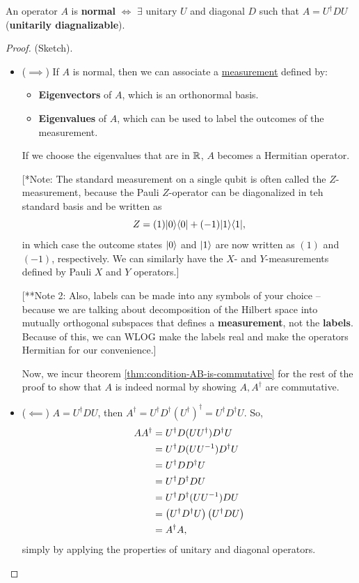 \documentclass[12pt]{article}
\begin{document}
\begin{theorem}
An operator $A$ is \textbf{normal} $\iff$ $\exists$ unitary $U$ and diagonal $D$ such that $A = U^\dag D U$ (\textbf{unitarily diagnalizable}).
\end{theorem}
\begin{proof}(Sketch).
\begin{itemize}
    \item ($\implies$) If $A$ is normal, then we can associate a \underline{measurement} defined by:
    \begin{itemize}
        \item \textbf{Eigenvectors} of $A$, which is an orthonormal basis.
        \item \textbf{Eigenvalues} of $A$, which can be used to label the outcomes of the measurement.
    \end{itemize}

    If we choose the eigenvalues that are in $\RR$, $A$ becomes a Hermitian operator.

    [*Note: The standard measurement on a single qubit is often called the $Z$-measurement, because the Pauli $Z$-operator can be diagonalized in teh standard basis and be written as $$
    Z = (1)\kb{0}{0} + (-1)\kb{1}{1},
    $$ in which case the outcome states $\Ket{0}$ and $\Ket{1}$ are now written as $(1)$ and $(-1)$, respectively. We can similarly have the $X$- and $Y$-measurements defined by Pauli $X$ and $Y$ operators.]

    [**Note 2: Also, labels can be made into any symbols of your choice -- because we are talking about decomposition of the Hilbert space into mutually orthogonal subspaces that defines a \textbf{measurement}, not the \textbf{labels}. Because of this, we can WLOG make the labels real and make the operators Hermitian for our convenience.]

    Now, we incur theorem \ref{thm:condition-AB-is-commutative} for the rest of the proof to show that $A$ is indeed normal by showing $A, A^\dag$ are commutative.
    \item ($\impliedby$) $A = U^\dag D U$, then $A^\dag = U^\dag D^\dag (U^\dag)^\dag = U^\dag D^\dag U$. So, $$
    \begin{aligned}
    AA^\dag
        &= U^\dag D (UU^\dag) D^\dag U\\
        &= U^\dag D (UU^{-1}) D^\dag U\\
        &= U^\dag DD^\dag U\\
        &= U^\dag D^\dag D U\\
        &= U^\dag D^\dag (UU^{-1}) D U\\
        &= \prt{U^\dag D^\dag U}\prt{U^\dag D U}\\
        &= A^\dag A,
    \end{aligned}
    $$ simply by applying the properties of unitary and diagonal operators.
\end{itemize}
\end{proof}
\end{document}
